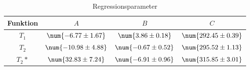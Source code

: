 \begin{table} 
 \centering 
 \begin{tabular}{S S S S } 
 \toprule  
{Funktion} & {$A$} & {$B$} & {$C$} \\ 
\midrule  
 $T_1$ & $\num{-6.77 \pm 1.67}$ & $\num{3.86\pm 0.18}$ & $\num{292.45 \pm 0.39}$ \\ 
$T_2$ & $\num{-10.98 \pm 4.88}$ & $\num{-0.67 \pm 0.52}$ & $\num{295.52 \pm 1.13}$ \\ 
$T_2*$ & $\num{32.83 \pm 7.24}$ & $\num{-6.91\pm 0.96}$ & $\num{315.85 \pm 3.01}$ \\ 
\bottomrule 
 \end{tabular} 
 \caption{Regressionsparameter} 
 \label{tab: regress} 
  \end{table}